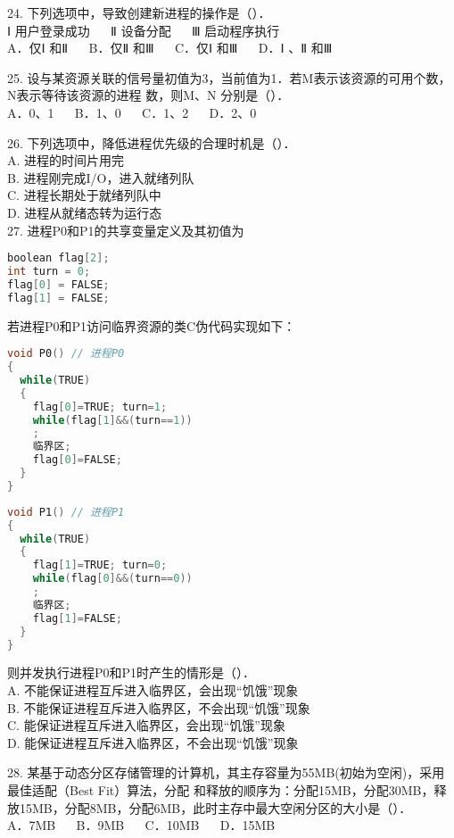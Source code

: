 24. 下列选项中，导致创建新进程的操作是（）． \\
Ⅰ 用户登录成功 $\quad$ Ⅱ 设备分配 $\quad$ Ⅲ 启动程序执行 \\
A．仅Ⅰ 和Ⅱ $\quad$ B．仅Ⅱ 和Ⅲ $\quad$ C．仅Ⅰ 和Ⅲ $\quad$ D．Ⅰ 、Ⅱ 和Ⅲ

25. 设与某资源关联的信号量初值为3，当前值为1．若M表示该资源的可用个数，N表示等待该资源的进程
数，则M、N 分别是（）． \\
A．0、1 $\quad$ B．1、0 $\quad$ C．1、2 $\quad$ D．2、0

26. 下列选项中，降低进程优先级的合理时机是（）． \\
A. 进程的时间片用完 \\
B. 进程刚完成I/O，进入就绪列队 \\
C. 进程长期处于就绪列队中 \\
D. 进程从就绪态转为运行态 \\

27. 进程P0和P1的共享变量定义及其初值为 \\
\begin{lstlisting}[language=cpp]
boolean flag[2];
int turn = 0;
flag[0] = FALSE;
flag[1] = FALSE;
\end{lstlisting}
若进程P0和P1访问临界资源的类C伪代码实现如下：
\begin{lstlisting}[language=cpp]
void P0() // 进程P0
{
  while(TRUE)
  {
    flag[0]=TRUE; turn=1;
    while(flag[1]&&(turn==1))
    ;
    临界区;
    flag[0]=FALSE;
  }
}
\end{lstlisting}

\begin{lstlisting}[language=cpp]
void P1() // 进程P1
{
  while(TRUE)
  {
    flag[1]=TRUE; turn=0;
    while(flag[0]&&(turn==0))
    ;
    临界区;
    flag[1]=FALSE;
  }
}
\end{lstlisting}
则并发执行进程P0和P1时产生的情形是（）．  \\
A. 不能保证进程互斥进入临界区，会出现“饥饿”现象 \\
B. 不能保证进程互斥进入临界区，不会出现“饥饿”现象 \\
C. 能保证进程互斥进入临界区，会出现“饥饿”现象 \\
D. 能保证进程互斥进入临界区，不会出现“饥饿”现象

28. 某基于动态分区存储管理的计算机，其主存容量为55MB(初始为空闲)，采用最佳适配（Best Fit）算法，分配
和释放的顺序为：分配15MB，分配30MB，释放15MB，分配8MB，分配6MB，此时主存中最大空闲分区的大小是（）． \\
A．7MB $\quad$ B．9MB $\quad$ C．10MB $\quad$ D．15MB

